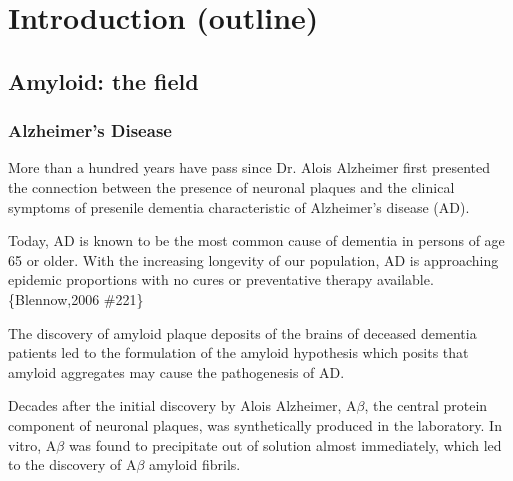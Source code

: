 \chapter{Introduction (outline)}

\section{Amyloid: the field} %


\subsection{Alzheimer's Disease}
\begin{outline}[enumerate]
\1 More than a hundred years have pass since Dr. Alois Alzheimer first presented the connection between the presence of neuronal plaques and the clinical symptoms of presenile dementia characteristic of Alzheimer's disease (AD).

\1 Today, AD is known to be the most common cause of dementia in persons of age 65 or older. With the increasing longevity of our population, AD is approaching epidemic proportions with no cures or preventative therapy available.\{Blennow,2006 \#221\}

\1 The discovery of amyloid plaque deposits of the brains of deceased dementia patients led to the formulation of the amyloid hypothesis which posits that amyloid aggregates may cause the pathogenesis of AD.  

\1 Decades after the initial discovery by Alois Alzheimer, A$\beta$, the central protein component of neuronal plaques, was synthetically produced in the laboratory. In vitro, A$\beta$ was found to precipitate out of solution almost immediately, which led to the discovery of A$\beta$ amyloid fibrils.


\end{outline}

